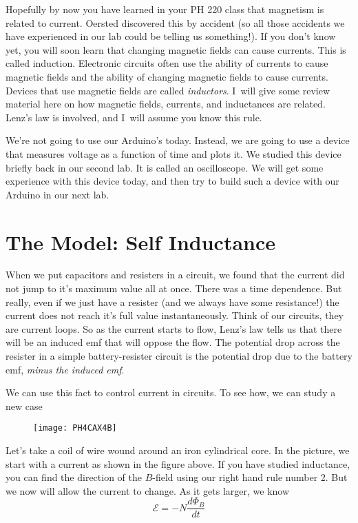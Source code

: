 Hopefully by now you have learned in your PH 220 class that magnetism is
related to current. Oersted discovered this by accident (so all those
accidents we have experienced in our lab could be telling us something!). If
you don't know yet, you will soon learn that changing magnetic fields can
cause currents. This is called induction. Electronic circuits often use the
ability of currents to cause magnetic fields and the ability of changing
magnetic fields to cause currents. Devices that use magnetic fields are
called \emph{inductors}. I\ will give some review material here on how
magnetic fields, currents, and inductances are related. Lenz's law is
involved, and I\ will assume you know this rule.

We're not going to use our Arduino's today. Instead, we are going to use a
device that measures voltage as a function of time and plots it. We studied
this device briefly back in our second lab. It is called an oscilloscope. We
will get some experience with this device today, and then try to build such
a device with our Arduino in our next lab.

\section{The Model: Self Inductance}

When we put capacitors and resisters in a circuit, we found that the current
did not jump to it's maximum value all at once. There was a time dependence.
But really, even if we just have a resister (and we always have some
resistance!) the current does not reach it's full value instantaneously.
Think of our circuits, they are current loops. So as the current starts to
flow, Lenz's law tells us that there will be an induced emf that will oppose
the flow. The potential drop across the resister in a simple
battery-resister circuit is the potential drop due to the battery emf, \emph{%
minus the induced emf}.

We can use this fact to control current in circuits. To see how, we can
study a new case\begin{figure}[h!]
\texttt{[image: PH4CAX4B]}
\end{figure}Let's take a coil of wire wound
around an iron cylindrical core. In the picture, we start with a current as
shown in the figure above. If you have studied inductance, you can find the
direction of the $B$-field using our right hand rule number 2. But we now
will allow the current to change. As it gets larger, we know 
\begin{equation*}
\mathcal{E}=-N\frac{d\Phi _{B}}{dt}
\end{equation*}

